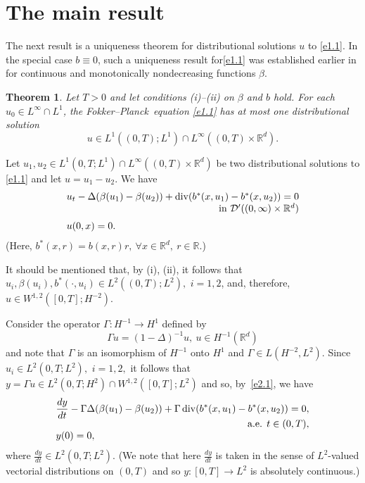 \documentclass[12pt]{article}
\def\rrd{{\rr^d}}
\def\cald{{\mathcal{D}}}
\def\vsp{\vspace*{1,5mm}\\ }
\def\n{\noindent }
\def\dd{\displaystyle}
\def\D{{\Delta}}
\def\barr{\begin{array}}
\def\earr{\end{array}}
\def\D{{\Delta}}
\def\FP{Fokker--Planck}
\newtheorem{theorem}{Theorem}[section]
\theoremstyle{definition}
\def\1{^{-1}}
\def\vsp{\vspace*{2mm}\\ }
\def\rr{{\mathbb{R}}}
\def\9{{\infty}}
\def\b{{\beta}}
\def\D{{\Delta}}
\def\barr{\begin{array}}
\def\earr{\end{array}}
\def\dd{\displaystyle}
\def\n{\noindent }
\def\vsp{\vspace*{2mm}\\ }
\def\ff{\forall }
\begin{document}
\section{The main result}
\setcounter{equation}{0}


The next result is a uniqueness theorem for distributional solutions $u$ to \eqref{e1.1}. In the special case $b\equiv0$, such a uniqueness result for\eqref{e1.1}  was established earlier in \cite{3} for continuous and monotonically nondecreasing functions $\b$.  

\begin{theorem}\label{t1} Let $T>0$ and let conditions {\rm(i)--(ii)} on $\beta$ and $b$ hold. For each $u_0\in L^\9\cap L^1$, the \FP\ equation \eqref{e1.1} has at most one distributional solution 
\begin{equation}\label{add-e5}
u\in L^1((0,T);L^1)\cap L^\9((0,T)\times\rrd).
\end{equation}
\end{theorem}

\n{\bf Proof.} Let $u_1,u_2\in L^1(0,T;L^1)\cap L^\9((0,T)\times\rrd)$ be two distributional solutions to \eqref{e1.1} and let $u=u_1-u_2.$ We have
\begin{equation}
\label{e2.1}
\barr{l}
u_t-\D(\b(u_1)-\b(u_2))+{\rm div}(b^*(x,u_1)-b^*(x,u_2))=0\\\hfill\mbox{ in }\cald'((0,\9)\times\rrd)\vsp 
u(0,x)=0.\earr
\end{equation}
(Here, $b^*(x,r)=b(x,r)r,\ \ff x\in\rrd,\ r\in\rr.$)

It should be mentioned that, by (i), (ii), it follows that $u_i,\beta(u_i), b^*(\cdot, u_i)\in L^2((0,T);L^2),$ $i=1,2$, and, therefore, $u\in W^{1,2}([0,T];H^{-2}).$ 

Consider the operator $\Gamma:H\1\to H^1$ defined by
$$\Gamma u=(1-\D)^{-1}u,\ u\in H\1(\rrd)$$and note that $\Gamma$ is an isomorphism of $H\1$ onto $H^1$ and $\Gamma\in L(H^{-2},L^2).$
 Since $u_i\in L^2(0,T;L^2),$ $i=1,2,$ it follows that $y=\Gamma u\in L^2(0,T;H^2)\cap W^{1,2}([0,T];L^2)$ and so, by~\eqref{e2.1},  we have
\begin{equation}
\label{e2.2}
\barr{l}
\dd\frac{dy}{dt}-\Gamma\D(\b(u_1)-\b(u_2))+\Gamma\,{\rm div}(b^*(x,u_1)-b^*(x,u_2))=0,\\\hfill\mbox{ a.e. }t\in(0,T),\\
y(0)=0,\earr
\end{equation}
where $\frac{dy}{dt}\in L^2(0,T;L^2).$  (We note that here $\frac{dy}{dt}$ is taken in the sense of $L^2$-valued vectorial distributions on $(0,T)$ and so $y:[0,T]\to L^2$ is absolutely continuous.)
\end{document}
